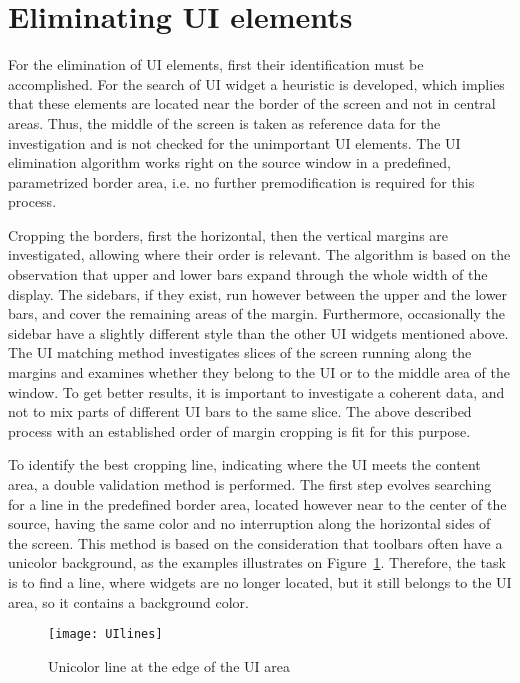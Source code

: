 \documentclass[draft,final]{vutinfth} %
\begin{document}
	\section{Eliminating UI elements}
	For the elimination of UI elements, first their identification must be accomplished. 
	For the search of UI widget a heuristic is developed, which implies that these elements are located near the border of the screen and not in central areas.
	Thus, the middle of the screen is taken as reference data for the investigation and is not checked for the unimportant UI elements.
	The UI elimination algorithm works right on the source window in a predefined, parametrized border area, i.e. no further premodification is required for this process.\par
	Cropping the borders, first the horizontal, then the vertical margins are investigated, allowing where their order is relevant.
	The algorithm is based on the observation that upper and lower bars expand through the whole width of the display.
	The sidebars, if they exist, run however between the upper and the lower bars, and cover the remaining areas of the margin.
	Furthermore, occasionally the sidebar have a slightly different style than the other UI widgets mentioned above.
	The UI matching method investigates slices of the screen running along the margins and examines whether they belong to the UI or to the middle area of the window.
	To get better results, it is important to investigate a coherent data, and not to mix parts of different UI bars to the same slice.
	The above described process with an established order of margin cropping is fit for this purpose. \par 
	To identify the best cropping line, indicating where the UI meets the content area, a double validation method is performed.
	The first step evolves searching for a line in the predefined border area, located however near to the center of the source, having the same color and no interruption along the horizontal sides of the screen.
	This method is based on the consideration that toolbars often have a unicolor background, as the examples illustrates on Figure~\ref{fig:lines}.
	Therefore, the task is to find a line, where widgets are no longer located, but it still belongs to the UI area, so it contains a background color.\par
	\begin{figure}[h]
		\centering		
		\texttt{[image: UIlines]}
		\caption{Unicolor line at the edge of the UI area}
		\label{fig:lines}
	\end{figure}
\end{document}
